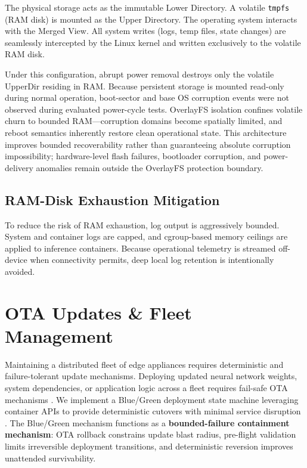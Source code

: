 \documentclass[conference]{IEEEtran}
\begin{document}
The physical storage acts as the immutable Lower Directory. A volatile \texttt{tmpfs} (RAM disk) is mounted as the Upper Directory. The operating system interacts with the Merged View. All system writes (logs, temp files, state changes) are seamlessly intercepted by the Linux kernel and written exclusively to the volatile RAM disk. 

Under this configuration, abrupt power removal destroys only the volatile UpperDir residing in RAM. Because persistent storage is mounted read-only during normal operation, boot-sector and base OS corruption events were not observed during evaluated power-cycle tests. OverlayFS isolation confines volatile churn to bounded RAM---corruption domains become spatially limited, and reboot semantics inherently restore clean operational state. This architecture improves bounded recoverability rather than guaranteeing absolute corruption impossibility; hardware-level flash failures, bootloader corruption, and power-delivery anomalies remain outside the OverlayFS protection boundary.

\subsection{RAM-Disk Exhaustion Mitigation}
To reduce the risk of RAM exhaustion, log output is aggressively bounded. System and container logs are capped, and cgroup-based memory ceilings are applied to inference containers. Because operational telemetry is streamed off-device when connectivity permits, deep local log retention is intentionally avoided.

\section{OTA Updates \& Fleet Management}

Maintaining a distributed fleet of edge appliances requires deterministic and failure-tolerant update mechanisms. Deploying updated neural network weights, system dependencies, or application logic across a fleet requires fail-safe OTA mechanisms \cite{b18}. We implement a Blue/Green deployment state machine leveraging container APIs to provide deterministic cutovers with minimal service disruption \cite{b9}. The Blue/Green mechanism functions as a \textbf{bounded-failure containment mechanism}: OTA rollback constrains update blast radius, pre-flight validation limits irreversible deployment transitions, and deterministic reversion improves unattended survivability.
\end{document}
